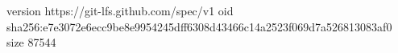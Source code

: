 version https://git-lfs.github.com/spec/v1
oid sha256:e7e3072e6ecc9be8e9954245dff6308d43466c14a2523f069d7a526813083af0
size 87544
